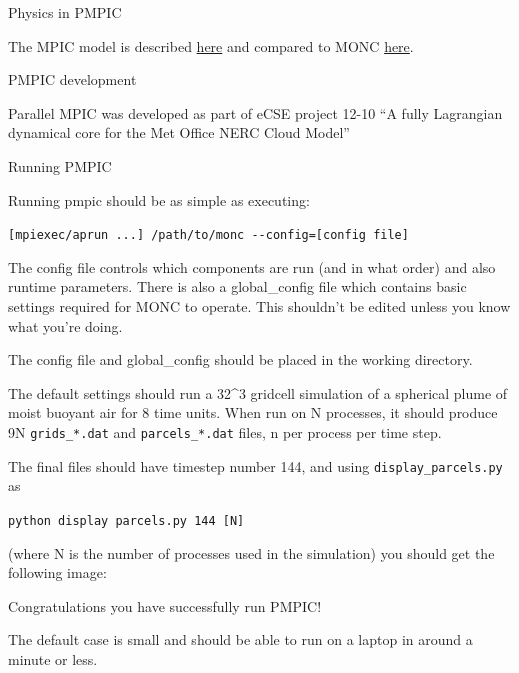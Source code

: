 \documentclass{beamer}
\begin{document}
\begin{frame}{Physics in PMPIC}
\protect\hypertarget{physics-in-pmpic}{}

The MPIC model is described
\href{https://rmets.onlinelibrary.wiley.com/doi/10.1002/qj.3319}{here}
and compared to MONC
\href{https://rmets.onlinelibrary.wiley.com/doi/abs/10.1002/qj.3532}{here}.

\end{frame}

\begin{frame}{PMPIC development}
\protect\hypertarget{pmpic-development}{}

Parallel MPIC was developed as part of eCSE project 12-10 ``A fully
Lagrangian dynamical core for the Met Office NERC Cloud Model''

\end{frame}

\begin{frame}[fragile]{Running PMPIC}
\protect\hypertarget{running-pmpic}{}

Running pmpic should be as simple as executing:

\texttt{{[}mpiexec/aprun\ ...{]}\ /path/to/monc\ -\/-config={[}config\ file{]}}

The config file controls which components are run (and in what order)
and also runtime parameters. There is also a global\_config file which
contains basic settings required for MONC to operate. This shouldn't be
edited unless you know what you're doing.

The config file and global\_config should be placed in the working
directory.

The default settings should run a 32\^{}3 gridcell simulation of a
spherical plume of moist buoyant air for 8 time units. When run on N
processes, it should produce 9N \texttt{grids\_*.dat} and
\texttt{parcels\_*.dat} files, n per process per time step.

The final files should have timestep number 144, and using
\texttt{display\_parcels.py} as

\texttt{python\ display\ parcels.py\ 144\ {[}N{]}}

(where N is the number of processes used in the simulation) you should
get the following image:


Congratulations you have successfully run PMPIC!

The default case is small and should be able to run on a laptop in
around a minute or less.

\end{frame}
\end{document}
